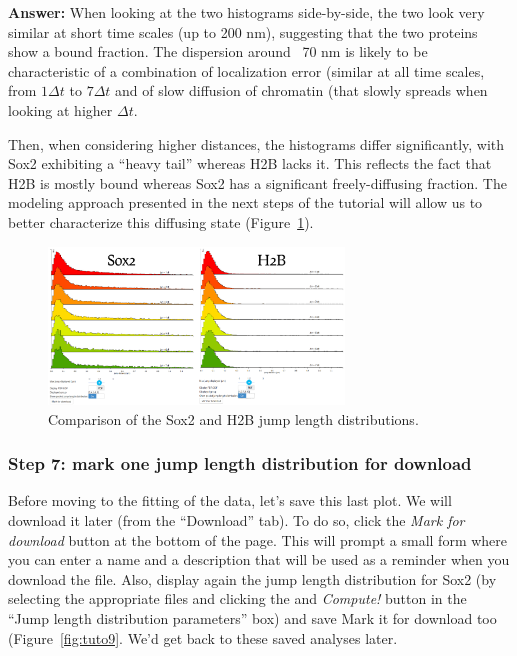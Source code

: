 \textbf{Answer:} When looking at the two histograms side-by-side, the two look very similar at short time scales (up to 200 nm), suggesting that the two proteins show a bound fraction. The dispersion around ~70 nm is likely to be characteristic of a combination of localization error (similar at all time scales, from \(1\Delta t\) to  \(7\Delta t\) and of slow diffusion of chromatin (that slowly spreads when looking at higher \(\Delta t\).

Then, when considering higher distances, the histograms differ significantly, with Sox2 exhibiting a ``heavy tail'' whereas H2B lacks it. This reflects the fact that H2B is mostly bound whereas Sox2 has a significant freely-diffusing fraction. The modeling approach presented in the next steps of the tutorial will allow us to better characterize this diffusing state (Figure~\ref{fig:tuto8}).

\begin{figure}[H]
\centering
\includegraphics[width=0.7\textwidth]{../SPTGUI/static/SPTGUI/img/tutorial/0.7/tuto8.png}
\caption{\label{fig:tuto8}Comparison of the Sox2 and H2B jump length distributions.}
\end{figure}

\subsubsection{Step 7: mark one jump length distribution for download}

Before moving to the fitting of the data, let's save this last plot. We will download it later (from the ``Download'' tab). To do so, click the \textit{Mark for download} button at the bottom of the page. This will prompt a small form where you can enter a name and a description that will be used as a reminder when you download the file. Also, display again the jump length distribution for Sox2 (by selecting the appropriate files and clicking the and \textit{Compute!} button in the ``Jump length distribution parameters'' box) and save Mark it for download too (Figure~\ref{fig:tuto9}. We'd get back to these saved analyses later.


